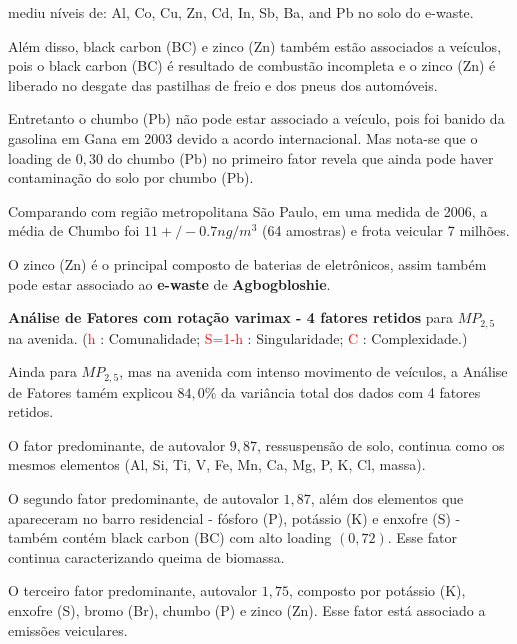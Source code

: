 \citep{asante2012} mediu níveis de:
Al, Co, Cu, Zn, Cd, In, Sb, Ba, and Pb no solo do e-waste.

Além disso, black carbon (BC) e zinco (Zn) também estão associados a veículos, 
pois o black carbon (BC) é resultado de combustão incompleta e o zinco (Zn) é
liberado no desgate das pastilhas de freio e dos pneus dos automóveis. 

Entretanto o chumbo (Pb) não pode estar associado a veículo, pois 
foi banido da gasolina em Gana em 2003 devido a acordo internacional. 
Mas nota-se que o loading de $0,30$ do chumbo (Pb) no primeiro fator revela 
que ainda pode haver contaminação do solo por chumbo (Pb).

Comparando com região metropolitana São Paulo, em uma medida de 2006, a média de Chumbo foi $11 +/- 0.7 ng/m^3$  
(64 amostras) e frota veicular 7 milhões. 

O zinco (Zn) é o principal composto de baterias de eletrônicos, assim também 
pode estar associado ao \textbf{e-waste} de \textbf{Agbogbloshie}.

\begin{table}[H]
  \caption{\textbf{Análise de Fatores com rotação varimax - 4 fatores retidos} 
             para $MP_{2,5}$ na avenida.
           (\textcolor{red}{h} : Comunalidade; 
           \textcolor{red}{S=1-h} : Singularidade; 
           \textcolor{red}{C} : Complexidade.)}
  
\end{table}

Ainda para $MP_{2,5}$, mas na avenida com intenso movimento de veículos,
a Análise de Fatores tamém explicou $84,0\%$ da variância total 
dos dados com 4 fatores retidos.

O fator predominante, de autovalor $9,87$, ressuspensão de solo, continua 
como os mesmos elementos (Al, Si, Ti, V, Fe, Mn, Ca, Mg, P, K, Cl, massa).

O segundo fator predominante, de autovalor $1,87$, além dos elementos que 
apareceram no barro residencial - fósforo (P), potássio (K) e enxofre (S) -
também contém black carbon (BC) com alto loading $(0,72)$. 
Esse fator continua caracterizando queima de biomassa.

O terceiro fator predominante, autovalor $1,75$, composto por
potássio (K), enxofre (S), bromo (Br), chumbo (P) e zinco (Zn). 
Esse fator está associado a emissões veiculares. 

